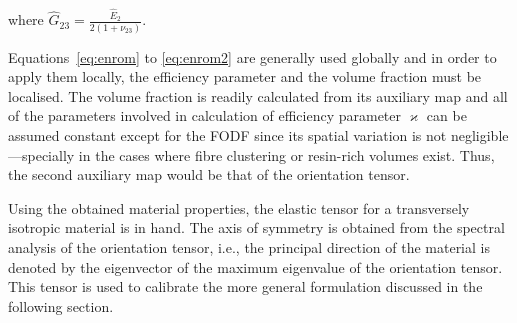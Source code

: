 	where $\hat{G}_{23}=\frac{\hat{E}_2}{2(1+\nu_{23})}$. 
	
	Equations~\eqref{eq:enrom} to \eqref{eq:enrom2} are generally used globally and in order to apply them locally, the efficiency parameter and the volume fraction must be localised. The volume fraction is readily calculated from its auxiliary map and all of the parameters involved in calculation of efficiency parameter $\varkappa$ can be assumed constant except for the FODF since its spatial variation is not negligible---specially in the cases where fibre clustering or resin-rich volumes exist. Thus, the second auxiliary map would be that of the orientation tensor. 
		
	Using the obtained material properties, the elastic tensor for a transversely isotropic material is in hand. The axis of symmetry is obtained from the spectral analysis of the orientation tensor, i.e., the principal direction of the material is denoted by the eigenvector of the maximum eigenvalue of the orientation tensor. This tensor is used to calibrate the more general formulation discussed in the following section.
	
	
%		
	
	
	


